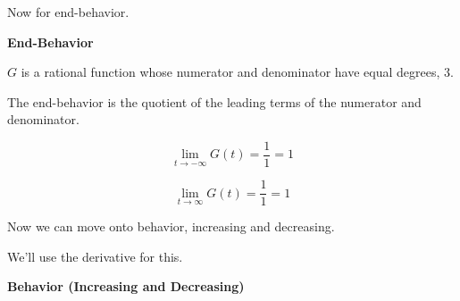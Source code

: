 \documentclass{ximera}
\begin{document}
Now for end-behavior. 








\textbf{\textcolor{purple!85!blue}{End-Behavior}} 

\begin{explanation}

$G$ is a rational function whose numerator and denominator have equal degrees, $3$.

The end-behavior is the quotient of the leading terms of the numerator and denominator.

\[
\lim\limits_{t \to -\infty} G(t) = \frac{1}{1} = 1
\]


\[
\lim\limits_{t \to \infty} G(t) = \frac{1}{1} = 1
\]

\end{explanation}




Now we can move onto behavior, increasing and decreasing.

We'll use the derivative for this. 

























\textbf{\textcolor{purple!85!blue}{Behavior (Increasing and Decreasing)}} 
\end{document}
